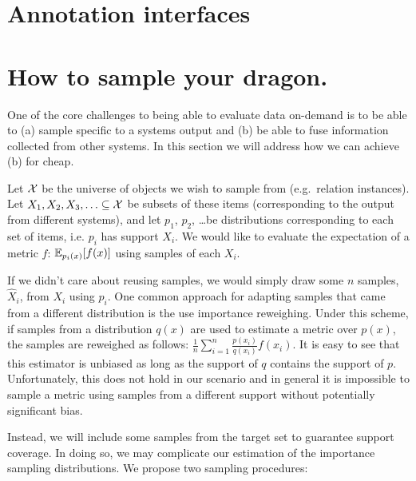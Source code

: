 \onecolumn
\section{Annotation interfaces}
\label{sec:interface}

\section{How to sample your dragon.}
\label{sec:sampling}

\newcommand{\Xh}{{\hat{X}}}

One of the core challenges to being able to evaluate data on-demand is to be able to (a) sample specific to a systems output and (b) be able to fuse information collected from other systems. In this section we will address how we can achieve (b) for cheap.

Let $\mathcal{X}$ be the universe of objects we wish to sample from (e.g.\ relation instances).
Let $X_1, X_2, X_3, \ldots \subseteq \mathcal{X}$ be subsets of these items (corresponding to the output from different systems),
and let $p_1$, $p_2$, \ldots be distributions corresponding to each set of items, i.e. $p_i$ has support $X_i$.
We would like to evaluate the expectation of a metric $f$: $\mathbb{E}_{p_i(x)}[f(x)]$ using samples of each $X_i$.

If we didn't care about reusing samples, we would simply draw some $n$ samples, $\Xh_i$, from $X_i$ using $p_i$.
One common approach for adapting samples that came from a different distribution is the use importance reweighing.
Under this scheme, if samples from a distribution $q(x)$ are used to estimate a metric over $p(x)$, the samples are reweighed as follows: $\frac{1}{n} \sum_{i=1}^n \frac{p(x_i)}{q(x_i)} f(x_i)$. It is easy to see that this estimator is unbiased as long as the support of $q$ contains the support of $p$.
Unfortunately, this does not hold in our scenario and in general it is impossible to sample a metric using samples from a different support without potentially significant bias.

Instead, we will include some samples from the target set to guarantee support coverage.
In doing so, we may complicate our estimation of the importance sampling distributions. 
We propose two sampling procedures:

%
%

